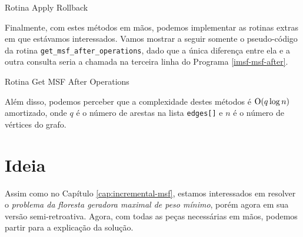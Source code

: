 \begin{algorithm}[h!]
    \caption{Rotina Apply Rollback}\label{imsf-apply-rollback}
    \begin{algorithmic}[1]
        \Else
        \EndIf
        \EndFor
        \EndFunction
    \end{algorithmic}
\end{algorithm}

Finalmente, com estes métodos em mãos, podemos implementar as rotinas extras em que estávamos interessados. Vamos mostrar a seguir somente o pseudo-código da rotina \texttt{get\_msf\_after\_operations}, dado que a única diferença entre ela e a outra consulta seria a chamada na terceira linha do Programa \ref{imsf-msf-after}.

\begin{algorithm}[h!]
    \caption{Rotina Get MSF After Operations}\label{imsf-msf-after}
    \begin{algorithmic}[1]
        \State {}
        \EndFunction
    \end{algorithmic}
\end{algorithm}

Além disso, podemos perceber que a complexidade destes métodos é $\mathrm{O}(q \log n)$ amortizado, onde $q$ é o número de arestas na lista \texttt{edges[]} e $n$ é o número de vértices do grafo.

\section{Ideia}
\label{sec:rmsf-ideia}

Assim como no Capítulo \ref{cap:incremental-msf}, estamos interessados em resolver o \emph{problema da floresta geradora maximal de peso mínimo}, porém agora em sua versão semi-retroativa. Agora, com todas as peças necessárias em mãos, podemos partir para a explicação da solução.

